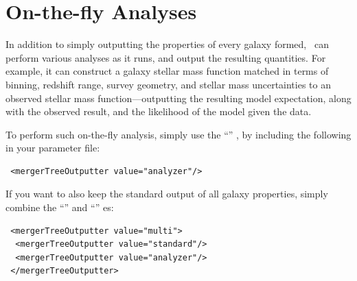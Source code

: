 \section{On-the-fly Analyses}\label{sec:onTheFlyAnalyses}

In addition to simply outputting the properties of every galaxy formed, \glc\ can perform various analyses as it runs, and output the resulting quantities. For example, it can construct a galaxy stellar mass function matched in terms of binning, redshift range, survey geometry, and stellar mass uncertainties to an observed stellar mass function---outputting the resulting model expectation, along with the observed result, and the likelihood of the model given the data. 

To perform such on-the-fly analysis, simply use the ``'' , by including the following in your parameter file:
\begin{verbatim}
 <mergerTreeOutputter value="analyzer"/>
\end{verbatim}
If you want to also keep the standard output of all galaxy properties, simply combine the ``'' and ``'' es:
\begin{verbatim}
 <mergerTreeOutputter value="multi">
  <mergerTreeOutputter value="standard"/>
  <mergerTreeOutputter value="analyzer"/>
 </mergerTreeOutputter>
\end{verbatim}

